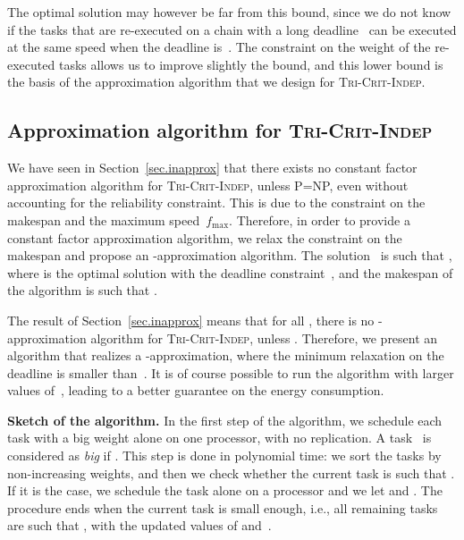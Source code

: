 \documentclass[a4paper]{article}
\theoremstyle{plain}
\theoremstyle{definition}
\theoremstyle{remark}
\newcommand{\fmax}{\ensuremath{f_{\max}}\xspace}
\newcommand{\indep}{\textsc{Tri-Crit-In\-dep}\xspace}
\begin{document}
The optimal solution may however be far from this bound, since we do
not know if the tasks that are re-executed on a chain with a long
deadline~ can be executed at the same speed when the deadline
is~. The constraint on the weight of the re-executed tasks allows
us to improve slightly the bound, and this lower bound is the basis of
the approximation algorithm that we design for \indep. 



\subsection{Approximation algorithm for \indep}
\label{algo.indep}



We have seen in Section~\ref{sec.inapprox} that there exists no
constant factor approximation algorithm for \indep, unless P=NP, even
without accounting for the reliability constraint. This is due to the
constraint on the makespan and the maximum speed~\fmax. Therefore, in
order to provide a constant factor approximation algorithm, we relax
the constraint on the makespan and propose an
-approxi\-mation algorithm. The solution~ is
such that , where  is
the optimal solution with the deadline constraint~, and the
makespan of the algorithm  is such that . 

The result of Section~\ref{sec.inapprox} means that for all , there is no -approxi\-mation algorithm for \indep,
unless .  Therefore, we present 
an algorithm that realizes a -approximation, where the minimum relaxation on
the deadline is smaller than~. It is of course
possible to run the algorithm with larger values of~, leading
to a better guarantee on the energy consumption. 




\medskip
{\bf Sketch of the algorithm.}  In the first step of the algorithm, we
schedule each task with a big weight alone on one
processor, with no replication. A task~ is considered as {\em big}
if . This step is done
in polynomial time: we sort the tasks by non-increasing
weights, and then we check whether the current task is such that . If it is the case, we schedule the task alone
on a processor and we let  and . The procedure ends
when the current task is small enough, i.e., all remaining tasks
are such that , with the updated values
of  and~. 



\newlength{\wiwi}
\end{document}
